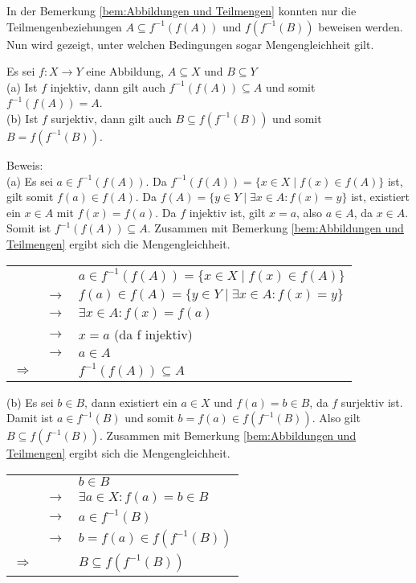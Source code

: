 \begin{Unit}[Bemerkung]
In der Bemerkung \ref{bem:Abbildungen und Teilmengen} konnten nur die
Teilmengenbeziehungen $A \subseteq f^{-1}(f(A))$ und $f(f^{-1}(B))$ beweisen 
werden. Nun wird gezeigt, unter welchen Bedingungen sogar Mengengleichheit 
gilt.

\begin{Bemerkung} 
  Es sei $f: X \rightarrow Y$ eine Abbildung, $A \subseteq X$ und 
  $B \subseteq Y$ \\
  (a) Ist $f$ injektiv, dann gilt auch $f^{-1}(f(A)) \subseteq A$ und somit 
    $f^{-1}(f(A)) = A$. \\
  (b) Ist $f$ surjektiv, dann gilt auch $B \subseteq f(f^{-1}(B))$ und somit 
    $B = f(f^{-1}(B))$.
\end{Bemerkung}
Beweis: \\
(a) Es sei $a \in f^{-1}(f(A))$. Da $f^{-1}(f(A)) = \{ x \in X \mid f(x) \in 
  f(A)\}$ ist, gilt somit $f(a) \in f(A)$. Da $f(A) = \{ y \in Y \mid 
  \exists x \in A: f(x) = y\}$ ist, existiert ein $x \in A$ mit $f(x) 
  = f(a)$. Da $f$ injektiv ist, gilt $x = a$, also $a \in A$, da $x \in A$. 
  Somit ist $f^{-1}(f(A)) \subseteq A$. Zusammen mit Bemerkung 
  \ref{bem:Abbildungen und Teilmengen} ergibt sich die Mengengleichheit.

\begin{tabular}{l l l}
  &            & $a \in f^{-1}(f(A)) = \{x \in X \mid f(x) \in f(A)\}$ \\
  & $\rightarrow$ & $f(a) \in f(A) = \{y \in Y \mid \exists x \in A: f(x) 
    = y\}$ \\
  & $\rightarrow$ & $\exists x \in A: f(x) = f(a)$\\
  & $\rightarrow$ & $x = a$ (da f injektiv) \\
  & $\rightarrow$ & $a \in A$ \\
  $\Rightarrow$ & & $f^{-1}(f(A)) \subseteq A$
\end{tabular}

(b) Es sei $b \in B$, dann existiert ein $a \in X$ und $f(a) = b \in B$, 
da $f$ surjektiv ist. Damit ist $a \in f^{-1}(B)$ und somit $b = f(a) \in 
f(f^{-1}(B))$. Also gilt $B \subseteq f(f^{-1}(B))$. Zusammen mit Bemerkung 
\ref{bem:Abbildungen und Teilmengen} ergibt sich die Mengengleichheit.
  
\begin{tabular}{l l l}
  &               & $b \in B$ \\
  & $\rightarrow$ & $\exists a \in X: f(a) = b \in B$\\
  & $\rightarrow$ & $a \in f^{-1}(B)$\\
  & $\rightarrow$ & $b = f(a) \in f(f^{-1}(B))$ \\
  $\Rightarrow$ & & $B \subseteq f(f^{-1}(B))$
\end{tabular}
\end{Unit}

